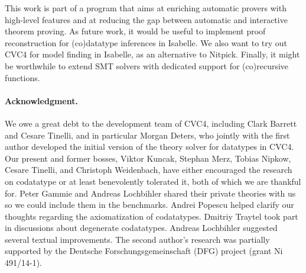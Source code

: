 This work is part of a program that aims at enriching automatic provers
with high-level features and at reducing the gap between automatic and
interactive theorem proving. As future work, it would be useful to implement
proof reconstruction for (co)data\-type inferences in Isabelle. We also
want to try out CVC4 for model finding in Isabelle, as an alternative to
Nitpick. Finally, it might be worthwhile to extend SMT solvers with dedicated
support for (co)recursive functions.


\def\ackname{Acknowledgment}
\paragraph{\ackname.}
We owe a great debt to the development team of CVC4, 
including Clark Barrett and Cesare Tinelli,
and in particular Morgan Deters,
who jointly with the first author developed the initial version 
of the theory solver for datatypes in CVC4.
%
Our present and former bosses, Viktor Kuncak, Stephan Merz, Tobias Nipkow,
Cesare Tinelli, and Christoph Weidenbach, have either encouraged the research on
codatatype or at least benevolently tolerated it, both of which we are thankful
for.
%
Peter Gammie and Andreas Lochbihler shared their private
theories with us so we could include them in the benchmarks.
Andrei Popescu helped clarify our thoughts regarding the axiomatization of
codatatypes. Dmitriy Traytel took part in discussions about degenerate
codatatypes.
%
Andreas Lochbihler suggested several textual improvements.
The second author's research was partially supported by the Deutsche
Forschungs\-gemein\-schaft (DFG) project
 (grant Ni\,491\slash 14-1).


{}


